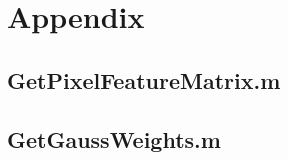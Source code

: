 \newpage
\section{Appendix}
\subsection{GetPixelFeatureMatrix.m}\label{GetPixelFeatureMatrix}

\subsection{GetGaussWeights.m}\label{GetGaussWeights}
